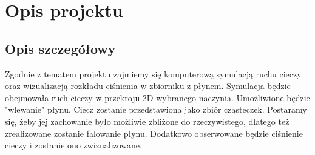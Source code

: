 \documentclass[a4paper]{article}
\begin{document}

\section{Opis projektu}
\subsection{Opis szczegółowy}
Zgodnie z tematem projektu zajmiemy się komputerową symulacją ruchu cieczy oraz wizualizacją rozkładu ciśnienia w zbiorniku z płynem.
Symulacja będzie obejmowała ruch cieczy w przekroju 2D wybranego naczynia.  Umożliwione będzie "wlewanie" płynu. Ciecz zostanie przedstawiona jako zbiór cząsteczek. Postaramy się, żeby jej zachowanie było możliwie zbliżone do rzeczywistego, dlatego też zrealizowane zostanie falowanie płynu.
Dodatkowo obserwowane będzie ciśnienie cieczy i zostanie ono zwizualizowane.
\end{document}

